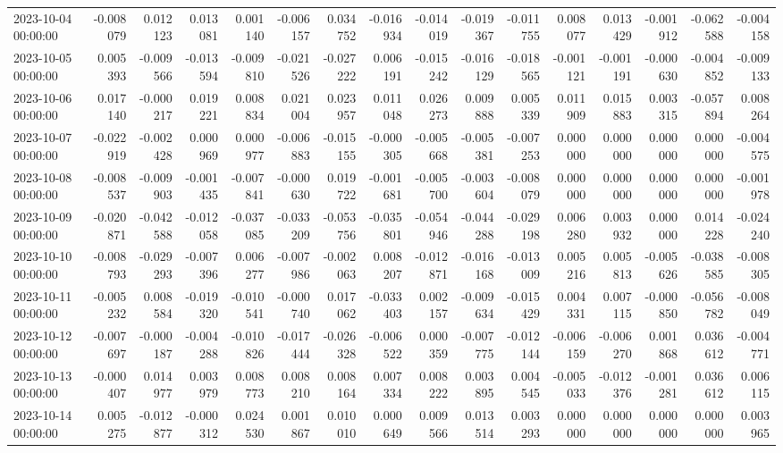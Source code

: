 \begin{tabular}{lrrrrrrrrrrrrrrr}
2023-10-04 00:00:00 & -0.008079 & 0.012123 & 0.013081 & 0.001140 & -0.006157 & 0.034752 & -0.016934 & -0.014019 & -0.019367 & -0.011755 & 0.008077 & 0.013429 & -0.001912 & -0.062588 & -0.004158 \\
2023-10-05 00:00:00 & 0.005393 & -0.009566 & -0.013594 & -0.009810 & -0.021526 & -0.027222 & 0.006191 & -0.015242 & -0.016129 & -0.018565 & -0.001121 & -0.001191 & -0.000630 & -0.004852 & -0.009133 \\
2023-10-06 00:00:00 & 0.017140 & -0.000217 & 0.019221 & 0.008834 & 0.021004 & 0.023957 & 0.011048 & 0.026273 & 0.009888 & 0.005339 & 0.011909 & 0.015883 & 0.003315 & -0.057894 & 0.008264 \\
2023-10-07 00:00:00 & -0.022919 & -0.002428 & 0.000969 & 0.000977 & -0.006883 & -0.015155 & -0.000305 & -0.005668 & -0.005381 & -0.007253 & 0.000000 & 0.000000 & 0.000000 & 0.000000 & -0.004575 \\
2023-10-08 00:00:00 & -0.008537 & -0.009903 & -0.001435 & -0.007841 & -0.000630 & 0.019722 & -0.001681 & -0.005700 & -0.003604 & -0.008079 & 0.000000 & 0.000000 & 0.000000 & 0.000000 & -0.001978 \\
2023-10-09 00:00:00 & -0.020871 & -0.042588 & -0.012058 & -0.037085 & -0.033209 & -0.053756 & -0.035801 & -0.054946 & -0.044288 & -0.029198 & 0.006280 & 0.003932 & 0.000000 & 0.014228 & -0.024240 \\
2023-10-10 00:00:00 & -0.008793 & -0.029293 & -0.007396 & 0.006277 & -0.007986 & -0.002063 & 0.008207 & -0.012871 & -0.016168 & -0.013009 & 0.005216 & 0.005813 & -0.005626 & -0.038585 & -0.008305 \\
2023-10-11 00:00:00 & -0.005232 & 0.008584 & -0.019320 & -0.010541 & -0.000740 & 0.017062 & -0.033403 & 0.002157 & -0.009634 & -0.015429 & 0.004331 & 0.007115 & -0.000850 & -0.056782 & -0.008049 \\
2023-10-12 00:00:00 & -0.007697 & -0.000187 & -0.004288 & -0.010826 & -0.017444 & -0.026328 & -0.006522 & 0.000359 & -0.007775 & -0.012144 & -0.006159 & -0.006270 & 0.001868 & 0.036612 & -0.004771 \\
2023-10-13 00:00:00 & -0.000407 & 0.014977 & 0.003979 & 0.008773 & 0.008210 & 0.008164 & 0.007334 & 0.008222 & 0.003895 & 0.004545 & -0.005033 & -0.012376 & -0.001281 & 0.036612 & 0.006115 \\
2023-10-14 00:00:00 & 0.005275 & -0.012877 & -0.000312 & 0.024530 & 0.001867 & 0.010010 & 0.000649 & 0.009566 & 0.013514 & 0.003293 & 0.000000 & 0.000000 & 0.000000 & 0.000000 & 0.003965 \\

\end{tabular}
